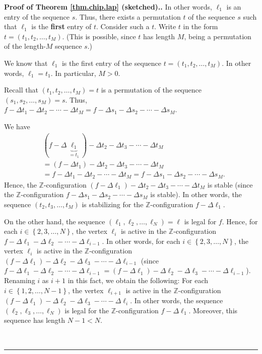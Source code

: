 \documentclass[numbers=enddot,12pt,final,onecolumn,notitlepage]{scrartcl}%
\theoremstyle{definition}
\newenvironment{proof}[1][Proof]{\noindent\textbf{#1.} }{\ \rule{0.5em}{0.5em}}
\newcommand{\ZZ}{\mathbb{Z}}
\begin{document}
\begin{proof}[Proof of Theorem \ref{thm.chip.lap} (sketched).]
In other words, $\ell_{1}$ is an entry of the sequence $s$. Thus, there exists
a permutation $t$ of the sequence $s$ such that $\ell_{1}$ is the
\textbf{first} entry of $t$. Consider such a $t$. Write $t$ in the form
$t=\left(  t_{1},t_{2},\ldots,t_{M}\right)  $. (This is possible, since $t$
has length $M$, being a permutation of the length-$M$ sequence $s$.)

We know that $\ell_{1}$ is the first entry of the sequence $t=\left(
t_{1},t_{2},\ldots,t_{M}\right)  $. In other words, $\ell_{1}=t_{1}$. In
particular, $M>0$.

Recall that $\left(  t_{1},t_{2},\ldots,t_{M}\right)  =t$ is a permutation of
the sequence $\left(  s_{1},s_{2},\ldots,s_{M}\right)  =s$. Thus, $f-\Delta
t_{1}-\Delta t_{2}-\cdots-\Delta t_{M}=f-\Delta s_{1}-\Delta s_{2}%
-\cdots-\Delta s_{M}$.

We have
\begin{align*}
& \left(  f-\Delta\underbrace{\ell_{1}}_{=t_{1}}\right)  -\Delta t_{2}-\Delta
t_{3}-\cdots-\Delta t_{M}\\
& =\left(  f-\Delta t_{1}\right)  -\Delta t_{2}-\Delta t_{3}-\cdots-\Delta
t_{M}\\
& =f-\Delta t_{1}-\Delta t_{2}-\cdots-\Delta t_{M}=f-\Delta s_{1}-\Delta
s_{2}-\cdots-\Delta s_{M}.
\end{align*}
Hence, the $\ZZ$-configuration $\left(  f-\Delta\ell_{1}\right)
-\Delta t_{2}-\Delta t_{3}-\cdots-\Delta t_{M}$ is stable (since the
$\ZZ$-configuration $f-\Delta s_{1}-\Delta s_{2}-\cdots-\Delta s_{M}$
is stable). In other words, the sequence $\left(  t_{2},t_{3},\ldots
,t_{M}\right)  $ is stabilizing for the $\ZZ$-configuration
$f-\Delta\ell_{1}$.

On the other hand, the sequence $\left(  \ell_{1},\ell_{2},\ldots,\ell
_{N}\right)  =\ell$ is legal for $f$. Hence, for each $i\in\left\{
2,3,\ldots,N\right\}  $, the vertex $\ell_{i}$ is active in the $\ZZ%
$-configuration $f-\Delta\ell_{1}-\Delta\ell_{2}-\cdots-\Delta\ell_{i-1}$. In
other words, for each $i\in\left\{  2,3,\ldots,N\right\}  $, the vertex
$\ell_{i}$ is active in the $\ZZ$-configuration $\left(  f-\Delta
\ell_{1}\right)  -\Delta\ell_{2}-\Delta\ell_{3}-\cdots-\Delta\ell_{i-1}$
(since
$f-\Delta\ell_{1}-\Delta\ell_{2}-\cdots-\Delta\ell_{i-1}
= \left(  f-\Delta
\ell_{1}\right)  -\Delta\ell_{2}-\Delta\ell_{3}-\cdots-\Delta\ell_{i-1}$).
Renaming $i$ as $i+1$ in this fact, we obtain the following: For each
$i\in\left\{  1,2,\ldots,N-1\right\}  $, the vertex $\ell_{i+1}$ is active in
the $\ZZ$-configuration $\left(  f-\Delta\ell_{1}\right)  -\Delta
\ell_{2}-\Delta\ell_{3}-\cdots-\Delta\ell_{i}$. In other words, the sequence
$\left(  \ell_{2},\ell_{3},\ldots,\ell_{N}\right)  $ is legal for the
$\ZZ$-configuration $f-\Delta\ell_{1}$. Moreover, this sequence has
length $N-1<N$.


\end{proof}
\end{document}
